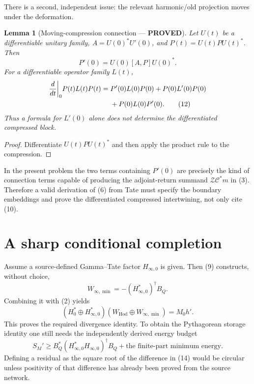 \documentclass[11pt]{article}
\newtheorem{lemma}[theorem]{Lemma}
\newcommand{\PROVED}{\textcolor{green!45!black}{\textbf{PROVED}}}
\newcommand{\Hod}{\mathrm{Hod}}
\newcommand{\cC}{\mathscr C}
\newcommand{\cZ}{\mathscr Z}
\begin{document}
There is a second, independent issue: the relevant harmonic/old projection
moves under the deformation.

\begin{lemma}[Moving-compression connection --- \PROVED]
Let $U(t)$ be a differentiable unitary family, $A=U(0)^*U'(0)$, and
$P(t)=U(t)P U(t)^*$.  Then
\begin{equation}
 P'(0)=U(0)[A,P]U(0)^*.                                  \tag{11}
\end{equation}
For a differentiable operator family $L(t)$,
\begin{align}
 \frac d{dt}\bigg|_0 P(t)L(t)P(t)
  ={}&P'(0)L(0)P(0)+P(0)L'(0)P(0)\notag\\
    &+P(0)L(0)P'(0).                                    \tag{12}
\end{align}
Thus a formula for $L'(0)$ alone does not determine the differentiated
compressed block.
\end{lemma}

\begin{proof}
Differentiate $U(t)PU(t)^*$ and then apply the product rule to the compression.
\end{proof}

In the present problem the two terms containing $P'(0)$ are precisely the
kind of connection terms capable of producing the adjoint-return summand
$\cZ\cC^*m$ in (3).  Therefore a valid derivation of (6) from Tate must specify
the boundary embeddings and prove the differentiated compressed intertwining,
not only cite (10).

\section{A sharp conditional completion}

Assume a source-defined Gamma--Tate factor $H_{\infty,0}$ is given.  Then (9)
constructs, without choice,
\[
 W_{\infty,\min}=-(H_{\infty,0}^*)^\dagger B_Q .
\]
Combining it with (2) yields
\[
 (H_0^*\oplus H_{\infty,0}^*)
 (W_{\Hod}\oplus W_{\infty,\min})=M_0h'.               \tag{13}
\]
This proves the required divergence identity.  To obtain the Pythagorean
storage identity one still needs the independently derived energy budget
\begin{equation}
 S_M'\ge B_Q^*(H_{\infty,0}^*H_{\infty,0})^\dagger B_Q
       +\text{the finite-part minimum energy}.           \tag{14}
\end{equation}
Defining a residual as the square root of the difference in (14) would be
circular unless positivity of that difference has already been proved from
the source network.
\end{document}
